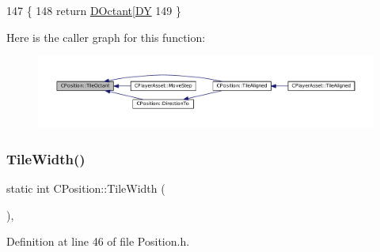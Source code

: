 \begin{DoxyCode}
147                                       \{
148     \textcolor{keywordflow}{return} \hyperlink{classCPosition_a0f7a420e82a180b983e32258729bb984}{DOctant}[\hyperlink{classCPosition_a84139c9e8eb547e7cf3cb851739943a4}{DY} %
149 \}
\end{DoxyCode}
Here is the caller graph for this function\+:
\nopagebreak
\begin{figure}[H]
\begin{center}
\leavevmode
\includegraphics[width=350pt]{classCPosition_a6acbc9445751b0a040c2971720f00088_icgraph}
\end{center}
\end{figure}
\hypertarget{classCPosition_a27a7a8b9a5541da0aa8d97d785650fb8}{}\label{classCPosition_a27a7a8b9a5541da0aa8d97d785650fb8} 
\subsubsection{\texorpdfstring{Tile\+Width()}{TileWidth()}}
{\footnotesize\ttfamily static int C\+Position\+::\+Tile\+Width (\begin{DoxyParamCaption}{ }\end{DoxyParamCaption})\hspace{0.3cm}{\ttfamily [inline]}, {\ttfamily [static]}}



Definition at line 46 of file Position.\+h.


